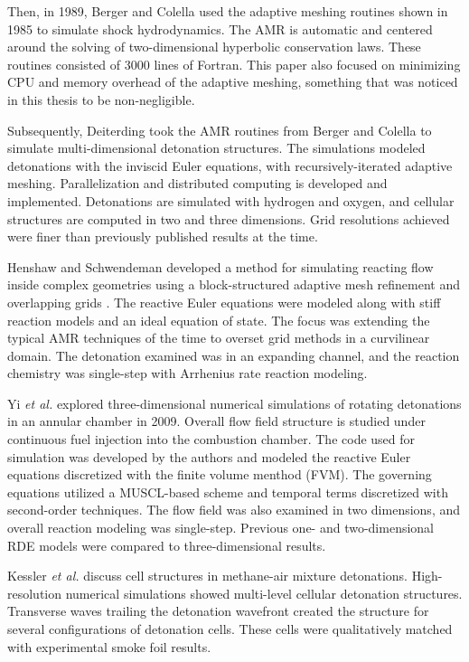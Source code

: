 Then, in 1989, Berger and Colella  \cite{berger1989} used the adaptive meshing routines shown in 1985 to simulate shock hydrodynamics. The AMR is automatic and centered around the solving of two-dimensional hyperbolic conservation laws. These routines consisted of 3000 lines of Fortran. This paper also focused on minimizing CPU and memory overhead of the adaptive meshing, something that was noticed in this thesis to be non-negligible. 

Subsequently, Deiterding  \cite{deiterding} took the AMR routines from Berger and Colella to simulate multi-dimensional detonation structures. The simulations modeled detonations with the inviscid Euler equations, with recursively-iterated adaptive meshing. Parallelization and distributed computing is developed and implemented. Detonations are simulated with hydrogen and oxygen, and cellular structures are computed in two and three dimensions. Grid resolutions achieved were finer than previously published results at the time. 

Henshaw and Schwendeman developed a method \cite{henshaw} for simulating reacting flow inside complex geometries using a block-structured adaptive mesh refinement and overlapping grids . The reactive Euler equations were modeled along with stiff reaction models and an ideal equation of state. The focus was extending the typical AMR techniques of the time to overset grid methods in a curvilinear domain. The detonation examined was in an expanding channel, and the reaction chemistry was single-step with Arrhenius rate reaction modeling. 

Yi \textit{et al.} \cite{yi} explored three-dimensional numerical simulations of rotating detonations in an annular chamber in 2009. Overall flow field structure is studied under continuous fuel injection into the combustion chamber. The code used for simulation was developed by the authors and modeled the reactive Euler equations discretized with the finite volume menthod (FVM). The governing equations utilized a MUSCL-based scheme \cite{vanleer} and temporal terms discretized with second-order techniques. The flow field was also examined in two dimensions, and overall reaction modeling was single-step. Previous one- and two-dimensional RDE models were compared to three-dimensional results. 

Kessler \textit{et al.} \cite{kessler} discuss cell structures in methane-air mixture detonations. High-resolution numerical simulations showed multi-level cellular detonation structures. Transverse waves trailing the detonation wavefront created the structure for several configurations of detonation cells. These cells were qualitatively matched with experimental smoke foil results. 

